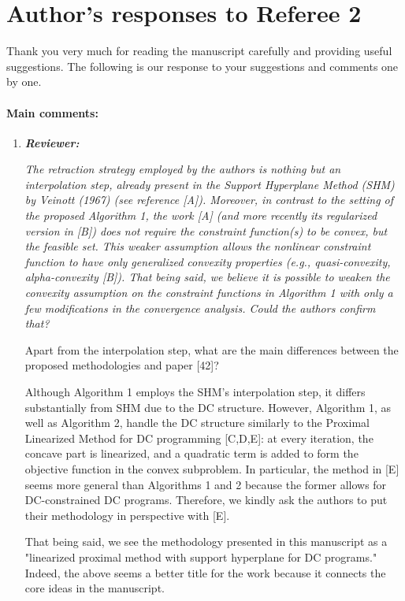 \documentclass{article}
\begin{document}
\section*{Author's responses to Referee 2}
Thank you very much for reading the manuscript carefully and providing useful suggestions. The following is our response to your suggestions and comments one by one.

\paragraph{Main comments:}
\begin{enumerate}
   \item \textit{\textbf{Reviewer:}} {\it The retraction strategy employed by the authors is nothing but an interpolation step, already present in the Support Hyperplane Method (SHM) by Veinott (1967) (see reference [A]). Moreover, in contrast to the setting of the proposed Algorithm 1, the work [A] (and more recently its regularized version in [B]) does not require the constraint function(s) to be convex, but the feasible set. This weaker assumption allows the nonlinear constraint function to have only generalized convexity properties (e.g., quasi-convexity, alpha-convexity [B]). That being said, we believe it is possible to weaken the convexity assumption on the constraint functions in Algorithm 1 with only a few modifications in the convergence analysis. Could the authors confirm that?

       Apart from the interpolation step, what are the main differences between the proposed methodologies and paper [42]?

Although Algorithm 1 employs the SHM's interpolation step, it differs substantially from SHM due to the DC structure. However, Algorithm 1, as well as Algorithm 2, handle the DC structure similarly to the Proximal Linearized Method for DC programming [C,D,E]: at every iteration, the concave part is linearized, and a quadratic term is added to form the objective function in the convex subproblem. In particular, the method in [E] seems more general than Algorithms 1 and 2 because the former allows for DC-constrained DC programs. Therefore, we kindly ask the authors to put their methodology in perspective with [E].

That being said, we see the methodology presented in this manuscript as a "linearized proximal method with support hyperplane for DC programs."
Indeed, the above seems a better title for the work because it connects the core ideas in the manuscript.}


\end{enumerate}
\end{document}
